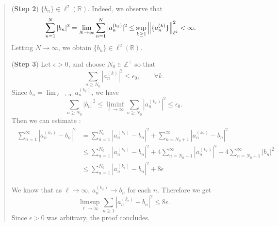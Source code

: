 \documentclass{article}
\begin{document}
\begin{itemize}
\begin{solutions}
\begin{quote}
				(\textbf{Step 2}) $\{b_{n}\} \in \ell^{2}(\mathbb{R})$. Indeed, we observe that 
					\begin{align}
						\begin{split}
							\sum_{n = 1}^{N}|b_{n}|^{2} &= \lim_{N \to \infty}\sum_{n = 1}^{N}|a_{n}^{(k_{\ell})}|^{2} \leq \sup_{k\geq 1}\left\Vert \{a_{n}^{(k)}\} \right\Vert_{\ell^{2}}^{2} < \infty.
						\end{split}
					\end{align}
				Letting $N \to \infty$, we obtain $\{b_{n}\} \in \ell^{2}(\mathbb{R})$. 
				
				(\textbf{Step 3}) Let $\epsilon > 0$, and choose $N_{0} \in \mathbb{Z}^{+}$ so that 
					\begin{equation}
						\sum_{n \geq N_{0}}|a_{n}^{(k)}|^{2} \leq \epsilon_{0}, \qquad \forall k. 
					\end{equation}
				Since $b_{n}= \lim_{\ell \to \infty}a_{n}^{(k_{\ell})}$, we have 
					\begin{equation}
						\sum_{n\geq N_{0}}|b_{n}|^{2} \leq \liminf_{\ell \to \infty}\sum_{n\geq N_{0}}|a_{n}^{(k_{\ell})}|^{2} \leq \epsilon_{0}. 
					\end{equation}
				Then we can estimate :
				\begin{align}
				\begin{split}
				\sum_{n=1}^{\infty} |a_n^{(k_{\ell})} - b_n|^2
				&= \sum_{n=1}^{N_0} |a_n^{(k_{\ell})} - b_n|^2
				+ \sum_{n=N_0+1}^{\infty} |a_n^{(k_{\ell})} - b_n|^2 \\
				&\leq \sum_{n=1}^{N_0} |a_n^{(k_{\ell})} - b_n|^2
				+ 4 \sum_{n=N_0+1}^{\infty} |a_n^{(k_{\ell})}|^2
				+ 4 \sum_{n=N_0+1}^{\infty} |b_n|^2 \\
				&\leq \sum_{n=1}^{N_0} |a_n^{(k_{\ell})} - b_n|^2 + 8\epsilon
				\end{split}
				\end{align}
				
				We know that as $\ell \to \infty$, $a_n^{(k_{\ell})} \to b_n$ for each $n$. Therefore we get 
					\begin{equation}
						\limsup_{\ell \to \infty}\sum_{n\geq 1}|a_{n}^{(k_{\ell})} - b_{n}|^{2} \leq 8 \epsilon. 
					\end{equation}
				Since $\epsilon > 0$ was arbitrary, the proof concludes. 
			\end{quote}
	\end{solutions}


\end{itemize}
\end{document}

